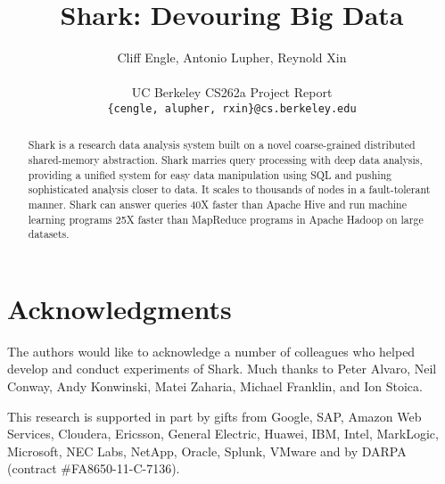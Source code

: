 \documentclass[preprint]{acm_proc_article-sp}
\begin{document}
\title{Shark: Devouring Big Data}

\author{
Cliff Engle,
Antonio Lupher,
Reynold Xin\\\\
UC Berkeley CS262a Project Report\\
\texttt{\{cengle, alupher, rxin\}@cs.berkeley.edu}
}

\maketitle
\begin{abstract}
Shark is a research data analysis system built on a novel coarse-grained distributed shared-memory abstraction. Shark marries query processing with deep data analysis, providing a unified system for easy data manipulation using SQL and pushing sophisticated analysis closer to data. It scales to thousands of nodes in a fault-tolerant manner. Shark can answer queries 40X faster than Apache Hive and run machine learning programs 25X faster than MapReduce programs in Apache Hadoop on large datasets.
\end{abstract}



























\section{Acknowledgments}
The authors would like to acknowledge a number of colleagues who helped develop and conduct experiments of Shark. Much thanks to Peter Alvaro, Neil Conway, Andy Konwinski, Matei Zaharia, Michael Franklin, and Ion Stoica.

This research is supported in part by gifts from Google, SAP, Amazon Web Services, Cloudera, Ericsson, General Electric, Huawei, IBM, Intel, MarkLogic, Microsoft, NEC Labs, NetApp, Oracle, Splunk, VMware and by DARPA (contract \#FA8650-11-C-7136).




\balancecolumns
\end{document}

